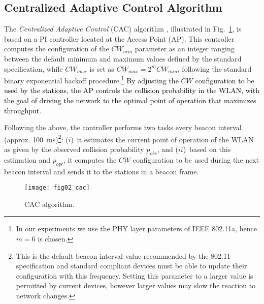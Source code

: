 \documentclass[a4paper,10pt]{article}
\newcommand{\revs}[1]{\textcolor{black}{#1}}
\begin{document}
\subsection{Centralized Adaptive Control Algorithm}

The \emph{Centralized Adaptive Control} (CAC) algorithm \cite{patras09monet}, illustrated in Fig.~\ref{fig:cac}, is based on a PI controller located at the Access Point (AP). This controller computes the configuration of the $CW_{min}$ parameter as an integer ranging between the default minimum and maximum values defined by the standard specification, while $CW_{max}$ is set as $CW_{max} = 2^m CW_{min}$, following the standard binary exponential backoff procedure.\footnote{In our experiments we use the PHY layer parameters of IEEE 802.11a, hence $m = 6$ is chosen.} \revs{By adjusting the $CW$  configuration to be used by the stations, the AP controls the collision probability in the WLAN, with the goal of driving the network to the optimal point of operation that maximizes throughput.}

Following the above, the controller performs two tasks every beacon interval (approx. 100~ms)\revs{\footnote{This is the default beacon interval value recommended by the 802.11 specification and standard compliant devices must be able to update their configuration with this frequency. Setting this parameter to a larger value is permitted by current devices, however larger values may slow the reaction to network changes.}}: ($i$)~it estimates the current point of operation of the WLAN as given by the observed collision probability $p_{obs}$, and ($ii$)~based on this estimation and $p_{opt}$, it computes the $CW$ configuration to be used during the next beacon interval and sends it to the stations in a beacon frame.

\begin{figure}
\centerline{\texttt{[image: fig02\_cac]}}
\caption{CAC algorithm.}
\label{fig:cac}
\end{figure}
\end{document}
